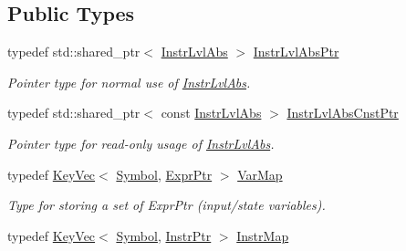 \subsection*{Public Types}
\begin{DoxyCompactItemize}
\item 
\mbox{\label{classilang_1_1_instr_lvl_abs_a743fd98e5ad145d70cb0dabf8db0007c}} 
typedef std\+::shared\+\_\+ptr$<$ \mbox{\hyperlink{classilang_1_1_instr_lvl_abs}{Instr\+Lvl\+Abs}} $>$ \mbox{\hyperlink{classilang_1_1_instr_lvl_abs_a743fd98e5ad145d70cb0dabf8db0007c}{Instr\+Lvl\+Abs\+Ptr}}
\begin{DoxyCompactList}\small\item\em Pointer type for normal use of \mbox{\hyperlink{classilang_1_1_instr_lvl_abs}{Instr\+Lvl\+Abs}}. \end{DoxyCompactList}\item 
\mbox{\label{classilang_1_1_instr_lvl_abs_a57464e2e6a69327715fa88963ebfb282}} 
typedef std\+::shared\+\_\+ptr$<$ const \mbox{\hyperlink{classilang_1_1_instr_lvl_abs}{Instr\+Lvl\+Abs}} $>$ \mbox{\hyperlink{classilang_1_1_instr_lvl_abs_a57464e2e6a69327715fa88963ebfb282}{Instr\+Lvl\+Abs\+Cnst\+Ptr}}
\begin{DoxyCompactList}\small\item\em Pointer type for read-\/only usage of \mbox{\hyperlink{classilang_1_1_instr_lvl_abs}{Instr\+Lvl\+Abs}}. \end{DoxyCompactList}\item 
\mbox{\label{classilang_1_1_instr_lvl_abs_a5e54b174e483f572aa6bcb712277cc0d}} 
typedef \mbox{\hyperlink{classilang_1_1_key_vec}{Key\+Vec}}$<$ \mbox{\hyperlink{classilang_1_1_symbol}{Symbol}}, \mbox{\hyperlink{namespaceilang_a7c4196c72e53ea4df4b7861af7bc3bce}{Expr\+Ptr}} $>$ \mbox{\hyperlink{classilang_1_1_instr_lvl_abs_a5e54b174e483f572aa6bcb712277cc0d}{Var\+Map}}
\begin{DoxyCompactList}\small\item\em Type for storing a set of Expr\+Ptr (input/state variables). \end{DoxyCompactList}\item 
\mbox{\label{classilang_1_1_instr_lvl_abs_a94f46f72965860f18ff0c90130da1d8b}} 
typedef \mbox{\hyperlink{classilang_1_1_key_vec}{Key\+Vec}}$<$ \mbox{\hyperlink{classilang_1_1_symbol}{Symbol}}, \mbox{\hyperlink{namespaceilang_af88a19312ae653d687a0d1207bb284f6}{Instr\+Ptr}} $>$ \mbox{\hyperlink{classilang_1_1_instr_lvl_abs_a94f46f72965860f18ff0c90130da1d8b}{Instr\+Map}}

\end{DoxyCompactItemize}
